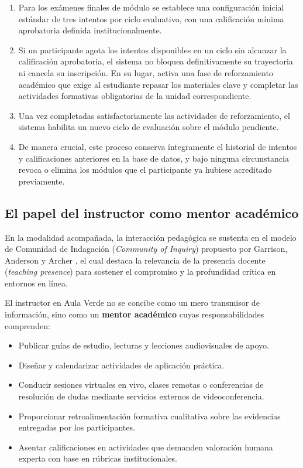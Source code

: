\begin{enumerate}
    \item Para los exámenes finales de módulo se establece una configuración inicial estándar de tres intentos por ciclo evaluativo, con una calificación mínima aprobatoria definida institucionalmente.
    \item Si un participante agota los intentos disponibles en un ciclo sin alcanzar la calificación aprobatoria, el sistema no bloquea definitivamente su trayectoria ni cancela su inscripción. En su lugar, activa una fase de reforzamiento académico que exige al estudiante repasar los materiales clave y completar las actividades formativas obligatorias de la unidad correspondiente.
    \item Una vez completadas satisfactoriamente las actividades de reforzamiento, el sistema habilita un nuevo ciclo de evaluación sobre el módulo pendiente.
    \item De manera crucial, este proceso conserva íntegramente el historial de intentos y calificaciones anteriores en la base de datos, y bajo ninguna circunstancia revoca o elimina los módulos que el participante ya hubiese acreditado previamente.
\end{enumerate}

\subsection{El papel del instructor como mentor académico}

En la modalidad acompañada, la interacción pedagógica se sustenta en el modelo de Comunidad de Indagación (\textit{Community of Inquiry}) propuesto por Garrison, Anderson y Archer \cite{garrison2000critical}, el cual destaca la relevancia de la presencia docente (\textit{teaching presence}) para sostener el compromiso y la profundidad crítica en entornos en línea.

El instructor en Aula Verde no se concibe como un mero transmisor de información, sino como un \textbf{mentor académico} cuyas responsabilidades comprenden:

\begin{itemize}
    \item Publicar guías de estudio, lecturas y lecciones audiovisuales de apoyo.
    \item Diseñar y calendarizar actividades de aplicación práctica.
    \item Conducir sesiones virtuales en vivo, clases remotas o conferencias de resolución de dudas mediante servicios externos de videoconferencia.
    \item Proporcionar retroalimentación formativa cualitativa sobre las evidencias entregadas por los participantes.
    \item Asentar calificaciones en actividades que demanden valoración humana experta con base en rúbricas institucionales.
\end{itemize}


